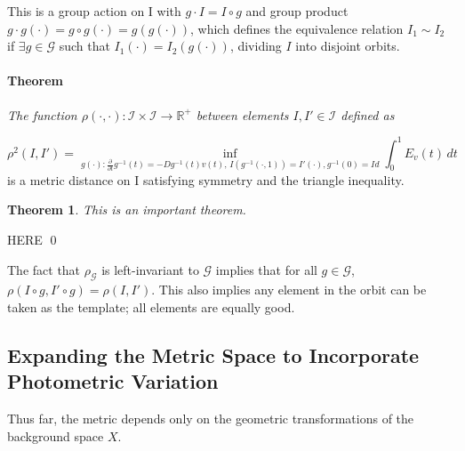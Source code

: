 \documentclass[preprint,review,8pt,times]{elsarticle}
\newtheorem{theorem}{Theorem}%
\begin{document}
This is a group action on I with $g \cdot I = I \circ g$ and group product $g \cdot g(\cdot) = g \circ g(\cdot) = g(g(\cdot))$, which defines the equivalence relation $I_{1} \sim I_{2}$ if $\exists g \in \mathcal{G}$ such that $I_{1}(\cdot) = I_{2}(g(\cdot))$, dividing $I$ into disjoint orbits.



\paragraph{Theorem}{\it The function $\rho(\cdot, \cdot): \mathcal{I} \times \mathcal{I} \rightarrow \mathbb{R}^{+}$ between elements $I, I' \in \mathcal{I}$ defined as

$$
\rho^{2}(I,I') = \underset{g(\cdot):\frac{\partial}{\partial t}g^{-1}(t) = -Dg^{-1}(t)v(t),\, I(g^{-1}(\cdot,1)) = I'(\cdot), g^{-1}(0) = Id}{\inf} \int_{0}^{1} E_{v}(t) \, dt
$$
is a metric distance on I satisfying symmetry and the triangle inequality.
}

\begin{theorem}
This is an important theorem.
\end{theorem}

HERE \qed

The fact that $\rho_{\mathcal{G}}$ is left-invariant to $\mathcal{G}$ implies that for all $g \in \mathcal{G}$, $\rho(I \circ g, I' \circ g) = ρ(I, I')$. This also implies any element in the orbit can be taken as the template; all elements are equally good.

\subsection{Expanding the Metric Space to Incorporate Photometric Variation}

Thus far, the metric depends only on the geometric transformations of the background space $X$.
\end{document}
